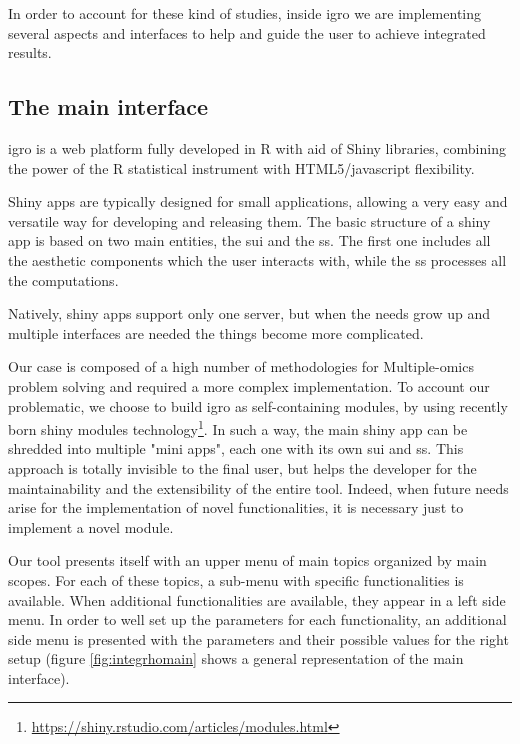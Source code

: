In order to account for these kind of studies, inside \gls{igro} we are implementing several aspects and interfaces to help and guide the user to achieve integrated results.

\subsection{The main interface}
\gls{igro} is a web platform fully developed in R with aid of Shiny libraries, combining the power of the R statistical instrument with HTML5/javascript flexibility.

Shiny apps are typically designed for small applications, allowing a very easy and versatile way for developing and releasing them.
The basic structure of a shiny app is based on two main entities, the \gls{sui} and the \gls{ss}.
The first one includes all the aesthetic components which the user interacts with, while the \gls{ss} processes all the computations.

Natively, shiny apps support only one server, but when the needs grow up and multiple interfaces are needed the things become more complicated. 

Our case is composed of a high number of methodologies for Multiple-omics problem solving and required a more complex implementation.
To account our problematic, we choose to build \gls{igro} as self-containing modules, by using recently born shiny modules technology\footnote{\url{https://shiny.rstudio.com/articles/modules.html}}.
In such a way, the main shiny app can be shredded into multiple "mini apps", each one with its own \gls{sui} and \gls{ss}.
This approach is totally invisible to the final user, but helps the developer for the maintainability and the extensibility of the entire tool.
Indeed, when future needs arise for the implementation of novel functionalities, it is necessary just to implement a novel module.

Our tool presents itself with an upper menu of main topics organized by main scopes. 
For each of these topics, a sub-menu with specific functionalities is available.
When additional functionalities are available, they appear in a left side menu.
In order to well set up the parameters for each functionality, an additional side menu is presented with the parameters and their possible values for the right setup (figure \ref{fig:integrhomain} shows a general representation of the main interface).

